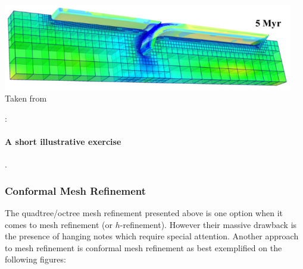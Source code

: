 \begin{center}
\includegraphics[height=3.8cm]{images/meshes/gltf18.jpg}\\
{\captionfont Taken from \cite{gltf18}}
\end{center}


\Literature: \cite{bugg08,bugg10}\cite{lezh11} \cite[sect 3]{bugs09} \cite{dadh07}
\cite{svna18} \cite{mish11}


\newpage
\paragraph{A short illustrative exercise}.




\subsubsection{Conformal Mesh Refinement}

The quadtree/octree mesh refinement presented above is one option
when it comes to mesh refinement (or $h$-refinement). However their 
massive drawback is the presence of hanging notes which require 
special attention. 
Another approach to mesh refinement is conformal mesh refinement
as best exemplified on the following figures: 

